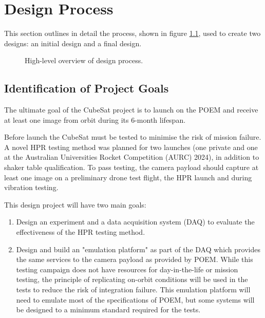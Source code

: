 \documentclass{report}
\begin{document}
\chapter{Design Process}
\label{sec:design-process}

This section outlines in detail the process, shown in figure \ref{fig:design-process-hl}, used to create two designs: an initial design and a final design.

\begin{figure}[H]
  \centering
  
  \caption{High-level overview of design process.}
  \label{fig:design-process-hl}
\end{figure}

\section{Identification of Project Goals}
\label{sec:constraints-and-requirements}

The ultimate goal of the CubeSat project is to launch on the POEM and receive at least one image from orbit during its 6-month lifespan.

Before launch the CubeSat must be tested to minimise the risk of mission failure. A novel HPR testing method was planned for two launches (one private and one at the Australian Universities Rocket Competition (AURC) 2024), in addition to shaker table qualification. To pass testing, the camera payload should capture at least one image on a preliminary drone test flight, the HPR launch and during vibration testing.


This design project will have two main goals:

\begin{enumerate}
  \item Design an experiment and a data acquisition system (DAQ) to evaluate the effectiveness of the HPR testing method.
  \item Design and build an "emulation platform" as part of the DAQ which provides the same services to the camera payload as provided by POEM. While this testing campaign does not have resources for day-in-the-life or mission testing, the principle of replicating on-orbit conditions will be used in the tests to reduce the risk of integration failure. This emulation platform will need to emulate most of the specifications of POEM, but some systems will be designed to a minimum standard required for the tests.
\end{enumerate}
\end{document}
